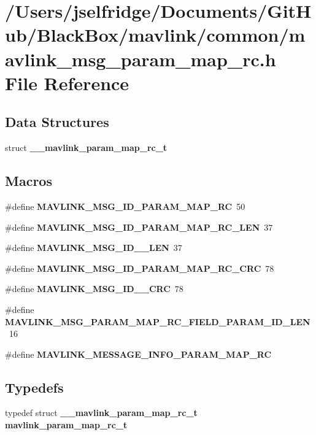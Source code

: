 \section{/\+Users/jselfridge/\+Documents/\+Git\+Hub/\+Black\+Box/mavlink/common/mavlink\+\_\+msg\+\_\+param\+\_\+map\+\_\+rc.h File Reference}
\label{mavlink__msg__param__map__rc_8h}
\subsection*{Data Structures}
\begin{DoxyCompactItemize}
\item 
struct \textbf{ \+\_\+\+\_\+mavlink\+\_\+param\+\_\+map\+\_\+rc\+\_\+t}
\end{DoxyCompactItemize}
\subsection*{Macros}
\begin{DoxyCompactItemize}
\item 
\#define \textbf{ M\+A\+V\+L\+I\+N\+K\+\_\+\+M\+S\+G\+\_\+\+I\+D\+\_\+\+P\+A\+R\+A\+M\+\_\+\+M\+A\+P\+\_\+\+RC}~50
\item 
\#define \textbf{ M\+A\+V\+L\+I\+N\+K\+\_\+\+M\+S\+G\+\_\+\+I\+D\+\_\+\+P\+A\+R\+A\+M\+\_\+\+M\+A\+P\+\_\+\+R\+C\+\_\+\+L\+EN}~37
\item 
\#define \textbf{ M\+A\+V\+L\+I\+N\+K\+\_\+\+M\+S\+G\+\_\+\+I\+D\+\_\+\_\+\+L\+EN}~37
\item 
\#define \textbf{ M\+A\+V\+L\+I\+N\+K\+\_\+\+M\+S\+G\+\_\+\+I\+D\+\_\+\+P\+A\+R\+A\+M\+\_\+\+M\+A\+P\+\_\+\+R\+C\+\_\+\+C\+RC}~78
\item 
\#define \textbf{ M\+A\+V\+L\+I\+N\+K\+\_\+\+M\+S\+G\+\_\+\+I\+D\+\_\+\_\+\+C\+RC}~78
\item 
\#define \textbf{ M\+A\+V\+L\+I\+N\+K\+\_\+\+M\+S\+G\+\_\+\+P\+A\+R\+A\+M\+\_\+\+M\+A\+P\+\_\+\+R\+C\+\_\+\+F\+I\+E\+L\+D\+\_\+\+P\+A\+R\+A\+M\+\_\+\+I\+D\+\_\+\+L\+EN}~16
\item 
\#define \textbf{ M\+A\+V\+L\+I\+N\+K\+\_\+\+M\+E\+S\+S\+A\+G\+E\+\_\+\+I\+N\+F\+O\+\_\+\+P\+A\+R\+A\+M\+\_\+\+M\+A\+P\+\_\+\+RC}
\end{DoxyCompactItemize}
\subsection*{Typedefs}
\begin{DoxyCompactItemize}
\item 
typedef struct \textbf{ \+\_\+\+\_\+mavlink\+\_\+param\+\_\+map\+\_\+rc\+\_\+t} \textbf{ mavlink\+\_\+param\+\_\+map\+\_\+rc\+\_\+t}
\end{DoxyCompactItemize}



